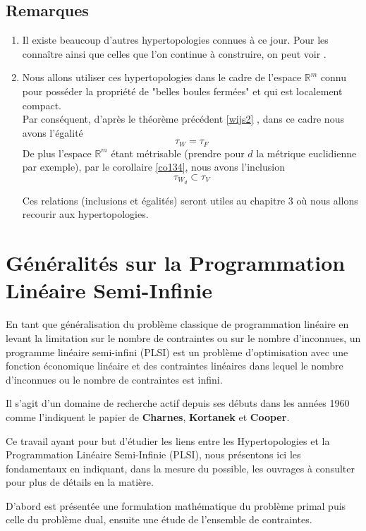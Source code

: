 \documentclass[11pt]{report}
\theoremstyle{styletheorem}
\theoremstyle{styledef}
\theoremstyle{remark}
\newcommand{\R}{\ensuremath{\mathbb{R}}}
\begin{document}
	\section{Remarques}
	\begin{enumerate}
		\item Il existe beaucoup d'autres hypertopologies connues à ce jour. Pour les connaître ainsi que celles que l'on continue à construire, on peut voir \cite{b5,b1,b8}.
		
		\item Nous allons utiliser ces hypertopologies dans le cadre de l'espace $\R^m$ connu pour posséder la propriété de "belles boules fermées" et qui est localement compact.\\
		Par conséquent, d'après le théorème précédent \ref{wijs2} , dans ce cadre nous avons l'égalité $$ \tau_W = \tau_F$$
		De plus l'espace $\R^m$ étant métrisable (prendre pour $d$ la métrique euclidienne par exemple), par le corollaire \ref{co134}, nous avons l'inclusion
		$$\tau_{W_d} \subset \tau_V$$
		
		Ces relations (inclusions et égalités) seront utiles au chapitre 3 où nous allons recourir aux hypertopologies.
	\end{enumerate}
	

\chapter{Généralités sur la Programmation Linéaire Semi-Infinie}
En tant que généralisation du problème classique de programmation linéaire en levant la limitation sur le nombre de contraintes ou sur le nombre d'inconnues, un programme linéaire semi-infini (PLSI) est un problème d'optimisation avec une fonction économique linéaire et des contraintes linéaires dans lequel le nombre d'inconnues ou le nombre de contraintes est infini.

Il s'agit d'un domaine de recherche actif depuis ses débuts dans les années 1960 comme l'indiquent le papier de \textbf{Charnes}, \textbf{Kortanek} et \textbf{Cooper}.

Ce travail ayant pour but d'étudier les liens entre les Hypertopologies et la Programmation Linéaire Semi-Infinie (PLSI), nous présentons ici les fondamentaux en indiquant, dans la mesure du possible, les ouvrages à consulter pour plus de détails en la matière.

D'abord est présentée une formulation mathématique du problème primal puis celle du problème dual, ensuite une étude de l'ensemble de contraintes.
\end{document}
